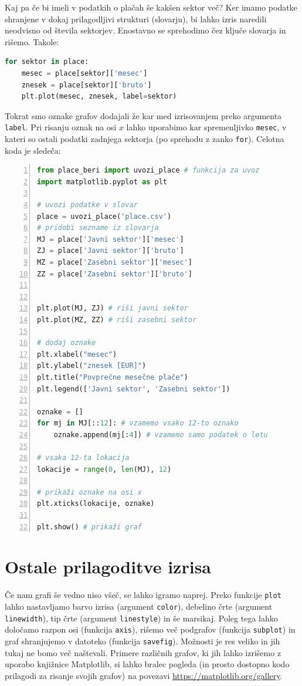 Kaj pa če bi imeli v podatkih o plačah še kakšen sektor več? Ker imamo podatke shranjene v dokaj prilagodljivi strukturi (slovarju), bi lahko izris naredili neodvisno od števila sektorjev. Enostavno se sprehodimo čez ključe slovarja in rišemo. Takole:
\begin{lstlisting}[language=Python]
for sektor in place:
    mesec = place[sektor]['mesec']
    znesek = place[sektor]['bruto']
    plt.plot(mesec, znesek, label=sektor)
\end{lstlisting}
Tokrat smo oznake grafov dodajali že kar med izrisovanjem preko argumenta \texttt{label}. Pri risanju oznak na osi $x$ lahko uporabimo kar spremenljivko \texttt{mesec}, v kateri so ostali podatki zadnjega sektorja (po sprehodu z zanko \texttt{for}). Celotna koda je sledeča: 
\begin{lstlisting}[language=Python, showstringspaces=false,numbers=left]
from place_beri import uvozi_place # funkcija za uvoz
import matplotlib.pyplot as plt

# uvozi podatke v slovar
place = uvozi_place('place.csv')
# pridobi sezname iz slovarja
MJ = place['Javni sektor']['mesec']
ZJ = place['Javni sektor']['bruto']
MZ = place['Zasebni sektor']['mesec']
ZZ = place['Zasebni sektor']['bruto']


plt.plot(MJ, ZJ) # riši javni sektor
plt.plot(MZ, ZZ) # riši zasebni sektor

# dodaj oznake
plt.xlabel("mesec")
plt.ylabel("znesek [EUR]")
plt.title("Povprečne mesečne plače")
plt.legend(['Javni sektor', 'Zasebni sektor'])

oznake = []
for mj in MJ[::12]: # vzamemo vsako 12-to oznako
    oznake.append(mj[:4]) # vzamemo samo podatek o letu

# vsaka 12-ta lokacija
lokacije = range(0, len(MJ), 12) 

# prikaži oznake na osi x
plt.xticks(lokacije, oznake)

plt.show() # prikaži graf
\end{lstlisting}

\section{Ostale prilagoditve izrisa}
Če nam grafi še vedno niso všeč, se lahko igramo naprej. Preko funkcije \texttt{plot} lahko nastavljamo barvo izrisa (argument \texttt{color}), debelino črte (argument \texttt{linewidth}), tip črte (argument \texttt{linestyle}) in še marsikaj. Poleg tega lahko določamo razpon osi (funkcija \texttt{axis}), rišemo več podgrafov (funkcija \texttt{subplot}) in graf shranjujemo v datoteko (funkcija \texttt{savefig}). Možnosti je res veliko in jih tukaj ne bomo več naštevali. Primere različnih grafov, ki jih lahko izrišemo z uporabo knjižnice Matplotlib, si lahko bralec pogleda (in prosto dostopno kodo prilagodi za risanje svojih grafov) na povezavi \url{https://matplotlib.org/gallery}.

